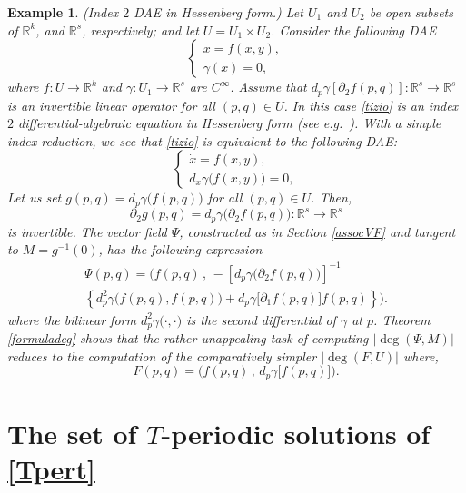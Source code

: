 \documentclass[a4paper]{amsart}
\numberwithin{equation}{section}
\newtheorem{example}[theorem]{Example}
\newcommand{\R}{\mathbb{R}}
\begin{document}
\begin{example} \emph{(Index $2$ DAE in Hessenberg form.)}
Let $U_1$ and $U_2$ be open subsets of $\R^k$, and $\R^s$, respectively; and let 
$U=U_1\times U_2$. Consider the following DAE
\begin{equation}\label{tizio}
 \left\{
\begin{array}{l}
 \dot x= f(x,y),\\
 \gamma(x)=0,
\end{array}\right.
\end{equation}
where $f:U\to\R^k$ and $\gamma:U_1\to\R^s$ are $C^\infty$. Assume that 
$d_p\gamma[\partial_2f(p,q)]:\R^s\to\R^s$ is an invertible linear operator for all
$(p,q)\in U$. In this case \eqref{tizio} is an index $2$ differential-algebraic equation in 
Hessenberg form (see e.g.\ \cite{KM}). With a simple index reduction, we see that 
\eqref{tizio} is equivalent to the following DAE:
\begin{equation}\label{tiziorid}
 \left\{
\begin{array}{l}
 \dot x= f(x,y),\\
 d_x\gamma\big( f(x,y)\big)=0,
\end{array}\right.
\end{equation}
Let us set $g(p,q)=d_p\gamma\big(f(p,q)\big)$ for all $(p,q)\in U$. Then, 
\[
\partial_2g(p,q)=d_p\gamma\big(\partial_2f(p,q)\big):\R^s\to\R^s
\]
is invertible. The vector field $\Psi$, constructed as in Section \ref{assocVF} and 
tangent to $M=g^{-1}(0)$, has the following expression
\begin{multline*}
 \Psi(p,q)=
\Big(f(p,q)\,,\, -\left[d_p\gamma\big(\partial_2f(p,q)\big)\right]^{-1}\\
     \left\{d_p^2\gamma\big(f(p,q),f(p,q)\big)
             +d_p\gamma\big[\partial_1f(p,q)\big]f(p,q)\right\}\Big).
\end{multline*}
where the bilinear form $d_p^2\gamma\big(\cdot,\cdot\big)$ is the second differential of 
$\gamma$ at $p$. Theorem \ref{formuladeg} shows that the rather unappealing task of computing
$|\deg(\Psi,M)|$ reduces to the computation of the comparatively simpler $|\deg(F,U)|$
where,
\[
 F(p,q)=\Big(f(p,q)\,,\,d_p\gamma \big[f(p,q)\big]\Big).
\]
\end{example}


\section{The set of $T$-periodic solutions of \eqref{Tpert}}
\end{document}
